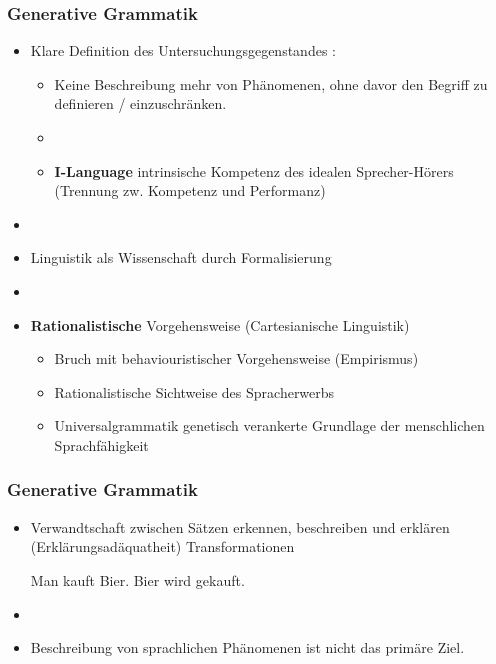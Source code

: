 \begin{frame}
\frametitle{Generative Grammatik}

\begin{itemize}
	\item Klare Definition des Untersuchungsgegenstandes :
	\begin{itemize}
		\item Keine Beschreibung mehr von  Phänomenen, ohne davor den Begriff  zu definieren / einzuschränken.
		\item[]
		\item \textbf{I-Language} \ras intrinsische Kompetenz des idealen Sprecher-Hörers (Trennung zw. Kompetenz und Performanz)
	\end{itemize}
	\item[]
	\item Linguistik als Wissenschaft \ras durch Formalisierung
	\item[]
	\item \textbf{Rationalistische} Vorgehensweise (Cartesianische Linguistik)
	\begin{itemize}
		\item Bruch mit behaviouristischer Vorgehensweise (Empirismus)
		\item Rationalistische Sichtweise des Spracherwerbs
		\item Universalgrammatik \ras genetisch verankerte Grundlage der menschlichen Sprachfähigkeit
	\end{itemize}
\end{itemize}

\end{frame}


\begin{frame}
\frametitle{Generative Grammatik}

\begin{itemize}
	\item Verwandtschaft zwischen Sätzen erkennen, beschreiben und erklären (Erklärungsadäquatheit) \ras Transformationen
	
	\eal 
	\ex Man kauft Bier.
	\ex Bier wird gekauft.
	\zl
	
	\item[]	
	\item Beschreibung von sprachlichen Phänomenen ist nicht das primäre Ziel.
\end{itemize}

\end{frame}


